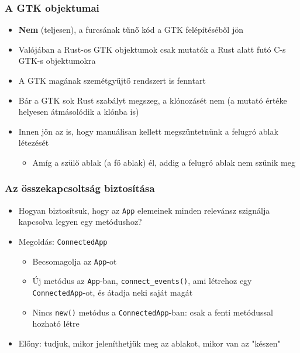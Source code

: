 \documentclass{beamer}
\begin{document}
    \begin{frame}[fragile]
        \frametitle{A GTK objektumai}

        \begin{itemize}
            \item \textbf{Nem} (teljesen), a furcsának tűnő kód a GTK felépítéséből jön
            \item Valójában a Rust-os GTK objektumok csak mutatók a Rust alatt futó C-s GTK-s objektumokra
            \item A GTK magának szemétgyűjtő rendszert is fenntart
            \item Bár a GTK sok Rust szabályt megszeg, a klónozásét nem (a mutató értéke helyesen átmásolódik a klónba is)
            \item Innen jön az is, hogy manuálisan kellett megszüntetnünk a felugró ablak létezését \begin{itemize}
                \item Amíg a szülő ablak (a fő ablak) él, addig a felugró ablak nem szűnik meg
            \end{itemize}
        \end{itemize}
    \end{frame}

    \begin{frame}[fragile]
        \frametitle{Az összekapcsoltság biztosítása}

        \begin{itemize}
            \item Hogyan biztosítsuk, hogy az \texttt{App} elemeinek minden relevánsz szignálja kapcsolva legyen egy metódushoz?
            \item Megoldás: \texttt{ConnectedApp} \begin{itemize}
                \item Becsomagolja az \texttt{App}-ot
                \item Új metódus az \texttt{App}-ban, \texttt{connect\_events()}, ami létrehoz egy \texttt{ConnectedApp}-ot, és átadja neki saját magát
                \item Nincs \texttt{new()} metódus a \texttt{ConnectedApp}-ban: csak a fenti metódussal hozható létre
            \end{itemize}
            \item Előny: tudjuk, mikor jeleníthetjük meg az ablakot, mikor van az "készen"
        \end{itemize}
    \end{frame}
\end{document}
